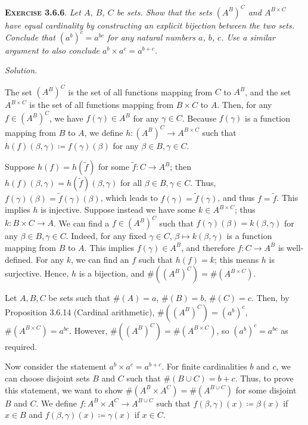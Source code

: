 \documentclass[12pt]{article}
\theoremstyle{remark}
\newenvironment{exer}[2]{
    \noindent \setlength{\parskip}{1em}%
    \textsc{\textbf{Exercise #1}}. \textit{#2} \par
    \noindent \textit{Solution.} %
}{\bigskip}
\begin{document}
\begin{exer}{3.6.6}{
    Let $A$, $B$, $C$ be sets.
    Show that the sets $(A^B)^C$ and $A^{B \times C}$ have equal cardinality by constructing an explicit bijection between the two sets.
    Conclude that $(a^b)^c = a^{bc}$ for any natural numbers $a$, $b$, $c$.
    Use a similar argument to also conclude $a^b \times a^c = a^{b+c}$.
}
    The set $(A^B)^C$ is the set of all functions mapping from $C$ to $A^B$,
    and the set $A^{B \times C}$ is the set of all functions mapping from $B \times C$ to $A$.
    Then, for any $f \in (A^B)^C$, we have $f(\gamma) \in A^B$ for any $\gamma \in C$.
    Because $f(\gamma)$ is a function mapping from $B$ to $A$, we define $h : (A^B)^C \to A^{B \times C}$ such that $h(f)(\beta, \gamma) \coloneqq f(\gamma)(\beta)$ for any $\beta \in B, \gamma \in C$.

    Suppose $h(f) = h(\tilde{f})$ for some $\tilde{f} : C \to A^B$; then $h(f)(\beta, \gamma) = h(\tilde{f})(\beta, \gamma)$ for all $\beta \in B, \gamma \in C$.
    Thus, $f(\gamma)(\beta) = \tilde{f}(\gamma)(\beta)$, which leads to $f(\gamma) = \tilde{f}(\gamma)$, and thus $f = \tilde{f}$.
    This implies $h$ is injective.
    Suppose instead we have some $k \in A^{B \times C}$; thus $k : B \times C \to A$.
    We can find a $f \in (A^B)^C$ such that $f(\gamma)(\beta) = k(\beta, \gamma)$ for any $\beta \in B, \gamma \in C$.
    Indeed, for any fixed $\gamma \in C$, $\beta \mapsto k(\beta, \gamma)$ is a function mapping from $B$ to $A$.
    This implies $f(\gamma) \in A^B$, and therefore $f : C \to A^B$ is well-defined.
    For any $k$, we can find an $f$ such that $h(f) = k$; this means $h$ is surjective.
    Hence, $h$ is a bijection, and $\#((A^B)^C) = \#(A^{B \times C})$.

    Let $A, B, C$ be sets such that $\#(A) = a$, $\#(B) = b$, $\#(C) = c$.
    Then, by Proposition 3.6.14 (Cardinal arithmetic), $\#((A^B)^C) = (a^b)^c$, $ \#(A^{B \times C}) = a^{bc}$.
    However, $\#((A^B)^C) = \#(A^{B \times C})$, so $(a^b)^c = a^{bc}$ as required.

    Now consider the statement $a^b \times a^c = a^{b+c}$.
    For finite cardinalities $b$ and $c$, we can choose disjoint sets $B$ and $C$ such that $\#(B \cup C) = b + c$.
    Thus, to prove this statement, we want to show $\#(A^B \times A^C) = \#(A^{B \cup C})$ for some disjoint $B$ and $C$.
    We define $f : A^B \times A^C \to A^{B \cup C}$ such that $f(\beta, \gamma)(x) \coloneqq \beta(x)$ if $x \in B$ and $f(\beta, \gamma)(x) \coloneqq \gamma(x)$ if $x \in C$.


\end{exer}
\end{document}
